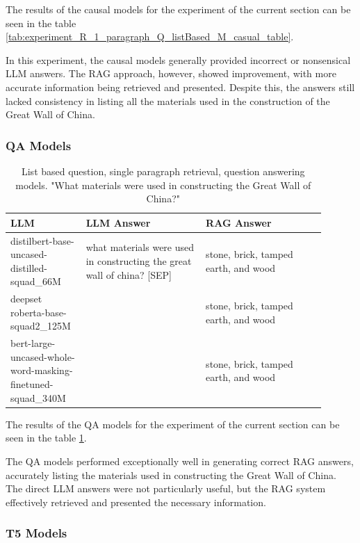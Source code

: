 \documentclass{wseas}
\begin{document}
The results of the causal models for the experiment of the current section can be seen 
in the table \ref{tab:experiment_R_1_paragraph_Q_listBased_M_casual_table}.

In this experiment, the causal models generally provided incorrect or
nonsensical LLM answers. The RAG approach, however, showed improvement,
with more accurate information being retrieved and presented. Despite
this, the answers still lacked consistency in listing all the materials
used in the construction of the Great Wall of China.

\subsubsection{QA Models}

\begin{table}[htbp]
  \centering
  \label{tab:experiment_R_1_paragraph_Q_listBased_M_QaModels_table}  %
  \caption{List based question, single paragraph retrieval, question answering models. "What materials were used in constructing the Great Wall of China?"} %
  \begin{tabular}{|p{0.20\linewidth}|p{0.35\linewidth}|p{0.35\linewidth}|}
    \hline
    \textbf{LLM} & \textbf{LLM Answer} & \textbf{RAG Answer} \\
    \hline
    distilbert-base-uncased-distilled-squad\_66M & what materials were used in constructing the great wall of china? {[}SEP{]} & stone, brick, tamped earth, and wood \\
    \hline
    deepset roberta-base-squad2\_125M & & stone, brick, tamped earth, and wood \\
    \hline
    bert-large-uncased-whole-word-masking-finetuned-squad\_340M & & stone, brick, tamped earth, and wood \\
    \hline
  \end{tabular}
\end{table}

The results of the QA models for the experiment of the current section
can be seen in the table \ref{tab:experiment_R_1_paragraph_Q_listBased_M_QaModels_table}.

The QA models performed exceptionally well in generating correct RAG
answers, accurately listing the materials used in constructing the Great
Wall of China. The direct LLM answers were not particularly useful, but
the RAG system effectively retrieved and presented the necessary
information.

\subsubsection{T5 Models}
\end{document}
